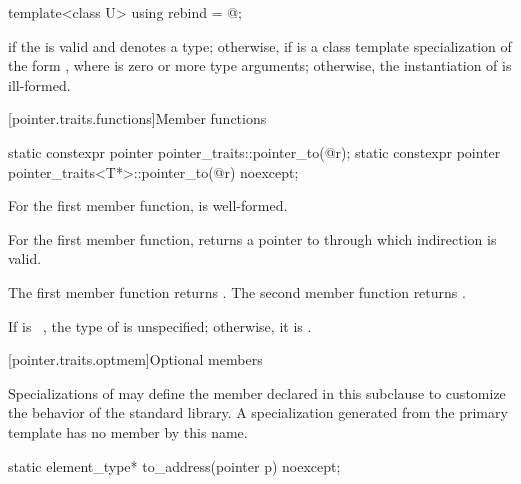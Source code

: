 %
\begin{itemdecl}
template<class U> using rebind = @\seebelow@;
\end{itemdecl}

\begin{itemdescr}
\pnum
\templalias {} if
the   is valid and denotes a
type; otherwise,
 if
 is a class template specialization of the form ,
where  is zero or more type arguments; otherwise, the instantiation of
 is ill-formed.
\end{itemdescr}

[pointer.traits.functions]{Member functions}

%
\begin{itemdecl}
static constexpr pointer pointer_traits::pointer_to(@\seebelow@ r);
static constexpr pointer pointer_traits<T*>::pointer_to(@\seebelow@ r) noexcept;
\end{itemdecl}

\begin{itemdescr}
\pnum
\mandates
For the first member function,
 is well-formed.

\pnum
\expects
For the first member function,
 returns a pointer to 
through which indirection is valid.

\pnum
\returns
The first member function returns .
The second member function returns .

\pnum
\remarks
If  is \cv{}~, the type of
 is unspecified; otherwise, it is .
\end{itemdescr}

[pointer.traits.optmem]{Optional members}

\pnum
Specializations of  may define the member declared
in this subclause to customize the behavior of the standard library.
A specialization generated from the  primary template
has no member by this name.

%
\begin{itemdecl}
static element_type* to_address(pointer p) noexcept;
\end{itemdecl}

